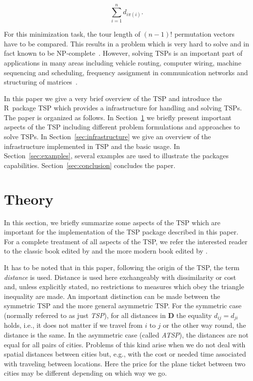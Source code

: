 \documentclass[10pt,a4paper,fleqn]{article}
\newcommand{\strong}[1]{{\normalfont\fontseries{b}\selectfont #1}}
\newcommand{\pkg}[1]{\strong{#1}}
\begin{document}
\begin{equation}
    \sum_{i=1}^n d_{i\pi(i)}.
\end{equation}

For this minimization task, the tour length of $(n-1)!$ permutation vectors
have to be compared. This results in a problem which is very hard to
solve and in fact known to be NP-complete~\citep{Johnson1985a}.
However, solving TSPs is an important part of applications in many areas
including vehicle routing, computer wiring, machine sequencing and scheduling,
frequency assignment in communication networks and structuring of
matrices~\citep{Lenstra1975, Punnen2002}.

In this paper we give a very brief overview of the TSP and introduce the
R~package \pkg{TSP} which provides a infrastructure for handling and
solving TSPs.
The paper is organized as follows.
In Section~\ref{sec:TSP} we briefly present important aspects of the TSP
including different problem formulations and approaches to solve TSPs.  In
Section~\ref{sec:infrastructure} we give an overview of the infrastructure
implemented in \pkg{TSP} and the basic usage.  In Section~\ref{sec:examples},
several examples are used to illustrate the packages capabilities.  
Section~\ref{sec:conclusion} concludes the paper.

\section{Theory}\label{sec:TSP}
In this section, we briefly summarize some aspects of the TSP
which are important for the implementation of the \pkg{TSP} package
described in this paper. For a complete treatment of all aspects of the
TSP, we refer the interested reader to the classic book edited by
\cite{Lawler1985} and the more modern book edited by \cite{Gutin2002}.

It has to be noted that in this paper, following the origin of the TSP, the
term \emph{distance} is used.  Distance is used here exchangeably with
dissimilarity or cost and, unless explicitly stated, no restrictions to
measures which obey the triangle inequality are made.  An important distinction
can be made between the symmetric TSP and the more general asymmetric TSP.  For
the symmetric case (normally referred to as just \emph{TSP}), for all distances
in $\mathbf{D}$ the equality $d_{ij} = d_{ji}$ holds, i.e., it does not matter if we
travel from $i$ to $j$ or the other way round, the distance is the same. In the
asymmetric case (called \emph{ATSP}), the distances are not equal for all pairs
of cities. Problems of this kind arise when we do not deal with spatial
distances between cities but, e.g., with the cost or needed time associated
with traveling between locations. Here the price for the plane ticket between
two cities may be different depending on which way we go.
\end{document}
